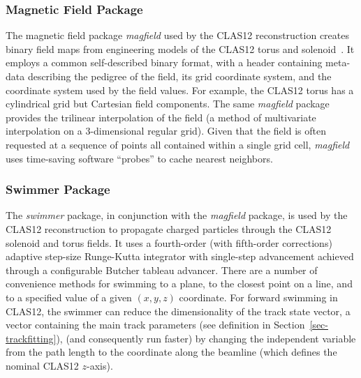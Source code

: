 \subsubsection{Magnetic Field Package}

The magnetic field package {\it magfield} used by the CLAS12 reconstruction creates binary field maps from
engineering models of the CLAS12 torus and solenoid~\cite{magnets-nim}. It employs a common self-described
binary format, with a header containing meta-data describing the pedigree of the field, its grid coordinate system,
and the coordinate system used by the field values. For example, the CLAS12 torus has a cylindrical grid but
Cartesian field components. The same {\it magfield} package provides the trilinear interpolation of the field (a
method of multivariate interpolation on a 3-dimensional regular grid). Given that the field is often requested at a
sequence of points all contained within a single grid cell, {\it magfield} uses time-saving software “probes” to cache
nearest neighbors.

\subsubsection{Swimmer Package}

The {\it swimmer} package, in conjunction with the {\it magfield} package, is used by the CLAS12 reconstruction
to propagate charged particles through the CLAS12 solenoid and torus fields. It uses a fourth-order (with
fifth-order corrections) adaptive step-size Runge-Kutta integrator with single-step advancement achieved through
a configurable Butcher tableau advancer. There are a number of convenience methods for swimming to a plane, to
the closest point on a line, and to a specified value of a given $(x,y,z)$ coordinate. For forward swimming in CLAS12,
the swimmer can reduce the dimensionality of the track state vector, a vector containing the main track parameters
(see definition in Section~\ref{sec-trackfitting}), (and consequently run faster) by changing the independent variable
from the path length to the coordinate along the beamline (which defines the nominal CLAS12 $z$-axis).
